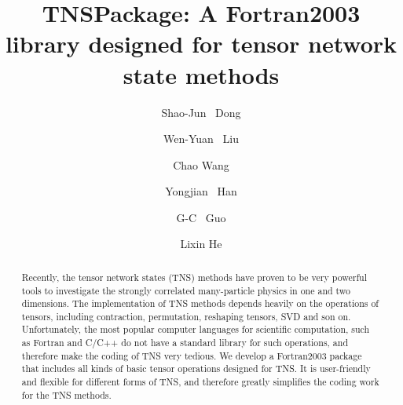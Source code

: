 \documentclass[preprint,3p,times,preprint,showpacs,amsmath,superscriptaddress,floatfix]{elsarticle}
\begin{document}
\begin{frontmatter}




\title{TNSPackage: A Fortran2003 library designed for tensor network state methods}


\author[add1,add2]{Shao-Jun ~Dong}

\author[add1,add2]{Wen-Yuan ~Liu}

\author[add1,add2]{Chao Wang}

\author[add1,add2]{Yongjian ~Han}

\author[add1,add2]{G-C ~Guo}

\author[add1,add2]{Lixin He}



\address[add1]{CAS Key Laboratory of Quantum Information, University of Science and Technology of China, Hefei, Anhui, 230026, China}
\address[add2]{Synergetic Innovation Center of Quantum Information and Quantum Physics, University of Science and Technology of China, Hefei, Anhui, 230026, China}



\begin{abstract}
{Recently, the tensor network states (TNS) methods have proven to be very powerful tools to
investigate the strongly correlated many-particle physics in one and two dimensions.
The implementation of TNS methods depends heavily on the operations of tensors,
including contraction, permutation, reshaping tensors, SVD and son on.
Unfortunately, the most popular computer languages for scientific computation,
such as Fortran and C/C++ do not have a standard library for such operations, and therefore make the coding of TNS very tedious.
We develop a Fortran2003 package that includes all kinds of basic tensor operations
designed for TNS. It is user-friendly and flexible for different forms of TNS, and therefore
greatly simplifies the coding work for the TNS methods. }
\end{abstract}


\end{frontmatter}
\end{document}
